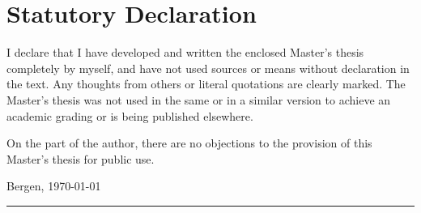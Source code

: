 \documentclass[crop=false]{standalone}
\begin{document}


  \section*{Statutory Declaration}
  \thispagestyle{empty}
  I declare that I have developed and written the enclosed Master's thesis completely by myself, and have not used sources or means without declaration in the text.
  Any thoughts from others or literal quotations are clearly marked.
  The Master's thesis was not used in the same or in a similar version to achieve an academic grading or is being published elsewhere.

  \noindent
  On the part of the author, there are no objections to the provision of this Master's thesis for public use.

  \vspace{2\baselineskip}

  \noindent
  Bergen, \today

  \noindent
  \hfill\rule{0.4\textwidth}{0.5pt}
  \vspace{0.1pt} \\
  {\\}
  \restoregeometry
\end{document}
